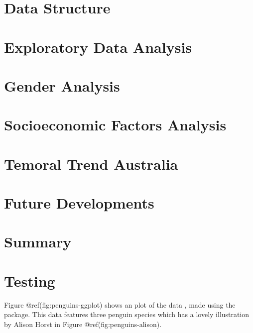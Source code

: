 \hypertarget{data-structure}{%
\section{Data Structure}\label{data-structure}}

\hypertarget{exploratory-data-analysis}{%
\section{Exploratory Data Analysis}\label{exploratory-data-analysis}}

\hypertarget{gender-analysis}{%
\section{Gender Analysis}\label{gender-analysis}}

\hypertarget{socioeconomic-factors-analysis}{%
\section{Socioeconomic Factors
Analysis}\label{socioeconomic-factors-analysis}}

\hypertarget{temoral-trend-australia}{%
\section{Temoral Trend Australia}\label{temoral-trend-australia}}

\hypertarget{future-developments}{%
\section{Future Developments}\label{future-developments}}

\hypertarget{summary}{%
\section{Summary}\label{summary}}

\hypertarget{testing}{%
\section{Testing}\label{testing}}

Figure @ref(fig:penguins-ggplot) shows an plot of the
 data \citep{palmerpenguins}, made using the
 package. This data features three penguin species
which has a lovely illustration by Alison Horst in Figure
@ref(fig:penguins-alison).

